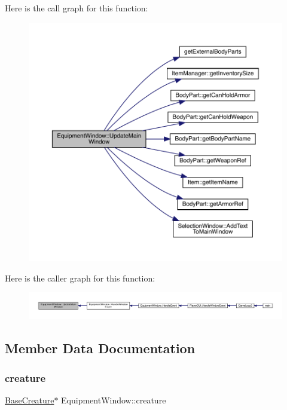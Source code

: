Here is the call graph for this function\+:
\nopagebreak
\begin{figure}[H]
\begin{center}
\leavevmode
\includegraphics[width=350pt]{d8/dcb/class_equipment_window_acf7d2c5609224291b20ad65d1241eeca_cgraph}
\end{center}
\end{figure}
Here is the caller graph for this function\+:
\nopagebreak
\begin{figure}[H]
\begin{center}
\leavevmode
\includegraphics[width=350pt]{d8/dcb/class_equipment_window_acf7d2c5609224291b20ad65d1241eeca_icgraph}
\end{center}
\end{figure}


\subsection{Member Data Documentation}
\mbox{\label{class_equipment_window_aa4e082610d80b8270a932220ae90c5c5}} 
\subsubsection{\texorpdfstring{creature}{creature}}
{\footnotesize\ttfamily \mbox{\hyperlink{class_base_creature}{Base\+Creature}}$\ast$ Equipment\+Window\+::creature\hspace{0.3cm}{\ttfamily [private]}}



